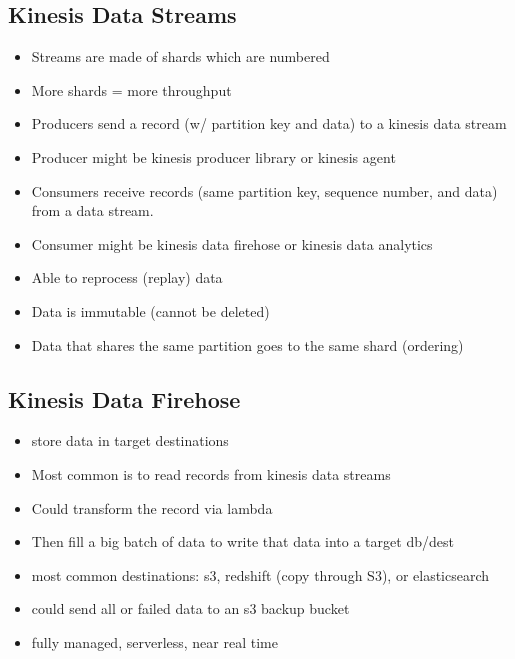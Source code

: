 \documentclass[]{scrartcl}
\begin{document}
\subsection{Kinesis Data Streams}
\begin{itemize}
	\item Streams are made of shards which are numbered
	\item More shards = more throughput
	\item Producers send a record (w/ partition key and data) to a kinesis data stream
	\item Producer might be kinesis producer library or kinesis agent
	\item Consumers receive records (same partition key, sequence number, and data) from a data stream.
	\item Consumer might be kinesis data firehose or kinesis data analytics
	\item Able to reprocess (replay) data
	\item Data is immutable (cannot be deleted)
	\item Data that shares the same partition goes to the same shard (ordering)
\end{itemize}

\subsection{Kinesis Data Firehose}
\begin{itemize}
	\item store data in target destinations
	\item Most common is to read records from kinesis data streams
	\item Could transform the record via lambda
	\item Then fill a big batch of data to write that data into a target db/dest
	\item most common destinations: s3, redshift (copy through S3), or elasticsearch
	\item could send all or failed data to an s3 backup bucket
	\item fully managed, serverless, near real time
\end{itemize}
\end{document}
